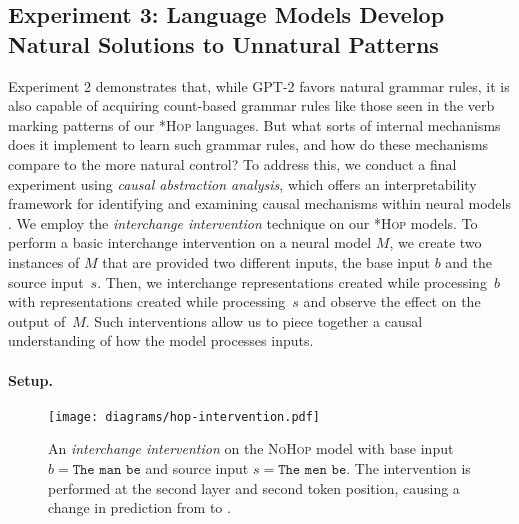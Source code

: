 \documentclass[11pt]{article}
\newcommand{\singularmarker}{%
  \setlength{\fboxsep}{1pt}%
  \fbox{\texttt{S}}%
}
\newcommand{\pluralmarker}{%
  \setlength{\fboxsep}{1pt}%
  \fbox{\texttt{P}}%
}
\newcommand{\highlight}[2]{%
    \begingroup
    \definecolor{hlcolor}{HTML}{#1}%
    \sethlcolor{hlcolor}%
    \hl{#2}%
    \endgroup
}
\newcommand{\tokensing}{%
  \highlight{FF77E6}{\singularmarker}%
}
\newcommand{\tokenplur}{%
  \highlight{3EC8FF}{\pluralmarker}%
}
\begin{document}
\subsection{Experiment 3: Language Models Develop Natural Solutions to Unnatural Patterns} \label{sec:causal-abstractions}

Experiment 2 demonstrates that, while GPT-2 favors natural grammar rules, it is also capable of acquiring count-based grammar rules like those seen in the verb marking patterns of our \textsc{*Hop} languages. But what sorts of internal mechanisms does it implement to learn such grammar rules, and how do these mechanisms compare to the more natural control? To address this, we conduct a final experiment using \emph{causal abstraction analysis}, which offers an interpretability framework for identifying and examining causal mechanisms within neural models \cite{geiger-etal-2020-neural, geiger2021causal, wu-etal-2022-causal, pmlr-v202-wu23b, wu-etal-2023-Boundless-DAS, geiger2023finding}. We employ the \emph{interchange intervention} technique on our \textsc{*Hop} models. To perform a basic interchange intervention on a neural model $M$, we create two instances of $M$ that are provided two different inputs, the base input $b$ and the source input~$s$. Then, we interchange representations created while processing~$b$ with representations created while processing~$s$ and observe the effect on the output of~$M$. Such interventions allow us to piece together a causal understanding of how the model processes inputs.

\paragraph{Setup.}

\begin{figure}
\centering
\texttt{[image: diagrams/hop-intervention.pdf]}
\caption{An \emph{interchange intervention} on the \textsc{NoHop} model with base input $b = \texttt{The man be}$ and source input $s = \texttt{The men be}$. The intervention is performed at the second layer and second token position, causing a change in prediction from \tokensing \space to \tokenplur.}
\label{fig:hop-intervention}
\end{figure}
\end{document}
